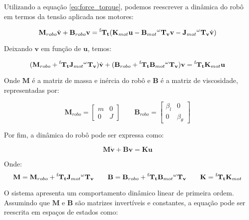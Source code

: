 Utilizando a equação \ref{eq:force_torque}, 
podemos reescrever a dinâmica do robô em 
termos da tensão aplicada nos motores:

\begin{equation}
\mathbf{M}_{robo} \dot{\mathbf{v}} + \mathbf{B}_{robo} \mathbf{v} = 
\mathbf{\prescript{\text{f}}{}{T_t}} (\mathbf{K}_{mot} \mathbf{u} - \mathbf{B}_{mot} \mathbf{\prescript{\omega}{}{T_v}} \mathbf{v} - \mathbf{J}_{mot} \mathbf{\prescript{\omega}{}{T_v}} \dot{\mathbf{v}})
\end{equation}

Deixando $\mathbf{v}$ em função de $\mathbf{u}$, temos:

\begin{equation}
(\mathbf{M}_{robo} + \mathbf{\prescript{\text{f}}{}{T_t}} \mathbf{J}_{mot} \mathbf{\prescript{\omega}{}{T_v}}) \dot{\mathbf{v}}
+
(\mathbf{B}_{robo} + \mathbf{\prescript{\text{f}}{}{T_t}} \mathbf{B}_{mot} \mathbf{\prescript{\omega}{}{T_v}}) \mathbf{v}
=
\mathbf{\prescript{\text{f}}{}{T_t}} \mathbf{K}_{mot} \mathbf{u}
\end{equation}

Onde $\mathbf{M}$ é a matriz de massa e inércia do robô e 
$\mathbf{B}$ é a matriz de viscosidade, representadas por:

\[
\mathbf{M}_{robo} =
\begin{bmatrix}
m & 0 \\
0 & J
\end{bmatrix}
\qquad
\mathbf{B}_{robo} =
\begin{bmatrix}
\beta_l & 0 \\
0 & \beta_{\theta}
\end{bmatrix}
\]

Por fim, a dinâmica do robô pode ser expressa como:

\begin{equation}
\mathbf{M} \dot{\mathbf{v}} + \mathbf{B} \mathbf{v} = \mathbf{K} \mathbf{u}
\label{eq:robot_dynamics}
\end{equation}

Onde:
\[
\mathbf{M} = \mathbf{M}_{robo} + \mathbf{\prescript{\text{f}}{}{T_t}} \mathbf{J}_{mot} \mathbf{\prescript{\omega}{}{T_v}}
\qquad
\mathbf{B} = \mathbf{B}_{robo} + \mathbf{\prescript{\text{f}}{}{T_t}} \mathbf{B}_{mot} \mathbf{\prescript{\omega}{}{T_v}}
\qquad
\mathbf{K} = \mathbf{\prescript{\text{f}}{}{T_t}} \mathbf{K}_{mot}
\]

O sistema apresenta um comportamento dinâmico linear de 
primeira ordem. Assumindo que $\mathbf{M}$ 
e $\mathbf{B}$ são matrizes invertíveis e constantes, 
a equação pode ser reescrita em espaços de estados como:

